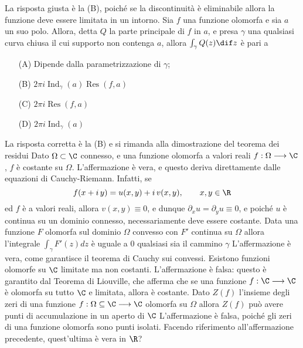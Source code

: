     La risposta giusta è la (B), poiché se la discontinuità è eliminabile allora la funzione deve essere limitata in un intorno. 
    Sia $f$ una funzione olomorfa e sia $a$ un suo polo. Allora, detta $Q$ la parte principale di $f$ in $a$, e presa $\gamma$ una qualsiasi curva chiusa il cui supporto non contenga $a$, allora $\int_{\gamma} Q(z) \dif z$ è pari a \begin{itemize}
        \item[(A)] Dipende dalla parametrizzazione di $\gamma$;
        \item[(B)] $2\pi i \operatorname{Ind}_{\gamma}(a) \operatorname{Res}(f,a)$
        \item[(C)] $2\pi i \operatorname{Res}(f,a)$
        \item[(D)] $2\pi i \operatorname{Ind}_{\gamma}(a)$
    \end{itemize}
    La risposta corretta è la (B) e si rimanda alla dimostrazione del teorema dei residui
    Dato $\Omega\subset\C$ connesso, e una funzione olomorfa a valori reali $f:\Omega\longrightarrow\C$, $ f $ è costante su $\Omega$. 
    L'affermazione è vera, e questo deriva direttamente dalle equazioni di Cauchy-Riemann. Infatti, se \[
        f(x+i\,y) = u(x,y) + i\,v(x,y),\qquad x,y \in \R
    \]ed $ f $ è a valori reali, allora $ v(x,y)\equiv 0 $, e dunque $ \partial_{x} u = \partial_{y} u \equiv 0 $, e poiché $ u $ è continua su un dominio connesso, necessariamente deve essere costante.
    Data una funzione $F$ olomorfa sul dominio $\Omega$ convesso con $F'$ continua su $\Omega$ allora l'integrale $\int_{\gamma}F'(z)dz$ è uguale a 0 qualsiasi sia il cammino $\gamma$
    L'affermazione è vera, come garantisce il teorema di Cauchy sui convessi. 
    Esistono funzioni olomorfe su $ \C $ limitate ma non costanti.
    L'affermazione è falsa: questo è garantito dal Teorema di Liouville, che afferma che se una funzione $ f: \C \longrightarrow \C $ è olomorfa su tutto $ \C $ e limitata, allora è costante.
    Dato $Z(f)$ l'insieme degli zeri di una funzione $f:\Omega \subseteq \C\longrightarrow\C$ olomorfa su $\Omega$ allora $Z(f)$ può avere punti di accumulazione in un aperto di $\C$
    L'affermazione è falsa, poiché gli zeri di una funzione olomorfa sono punti isolati. 
    Facendo riferimento all'affermazione precedente, quest'ultima è vera in $ \R $? 

